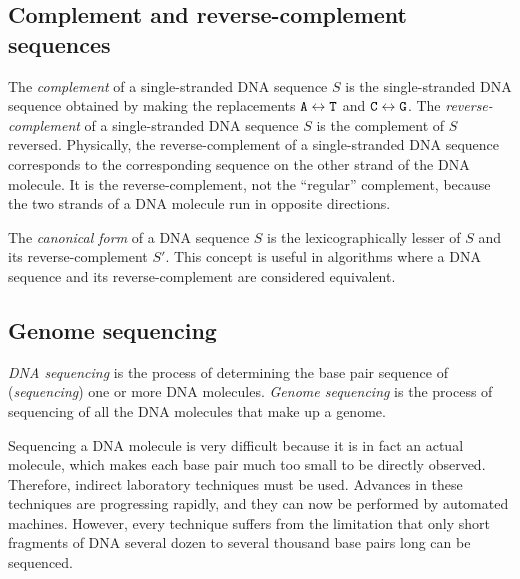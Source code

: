\documentclass[10pt]{article}
\newcommand\Base[1]{{\tt #1}}
\newcommand{\KeyTerm}[1]{{\it #1}}
\begin{document}
\subsection{Complement and reverse-complement sequences}

The \KeyTerm{complement} of a single-stranded DNA sequence $S$ is the
single-stranded DNA sequence obtained by making the replacements $\Base{A}
\leftrightarrow \Base{T}$ and $\Base{C} \leftrightarrow \Base{G}$.  The
\KeyTerm{reverse-complement} of a single-stranded DNA sequence $S$ is the
complement of $S$ reversed.  Physically, the reverse-complement of a
single-stranded DNA sequence corresponds to the corresponding sequence on the
other strand of the DNA molecule.  It is the reverse-complement, not the
``regular'' complement, because the two strands of a DNA molecule run in
opposite directions.

The \KeyTerm{canonical form} of a DNA sequence $S$ is the lexicographically
lesser of $S$ and its reverse-complement $S'$.  This concept is useful in
algorithms where a DNA sequence and its reverse-complement are considered
equivalent.

\subsection{Genome sequencing}

\KeyTerm{DNA sequencing} is the process of determining the base pair sequence of
(\KeyTerm{sequencing}) one or more DNA molecules.  \KeyTerm{Genome sequencing}
is the process of sequencing of all the DNA molecules that make up a genome.

Sequencing a DNA molecule is very difficult because it is in fact an actual
molecule, which makes each base pair much too small to be directly observed.
Therefore, indirect laboratory techniques must be used.  Advances in these
techniques are progressing rapidly, and they can now be performed by automated
machines.  However, every technique suffers from the limitation that only short
fragments of DNA several dozen to several thousand base pairs long can be
sequenced.
\end{document}
